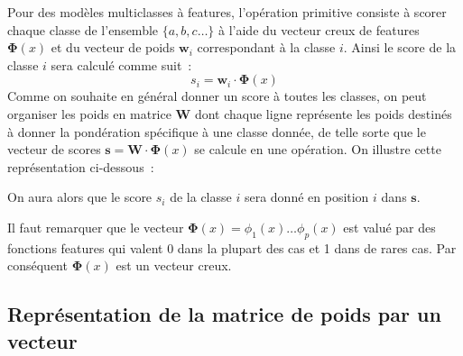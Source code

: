 \documentclass[11pt,openany]{book}
\begin{document}
Pour des modèles multiclasses à features,
l'opération primitive consiste à scorer chaque classe de l'ensemble $\{a,b,c\ldots\}$ à l'aide du vecteur creux de features $\boldsymbol\Phi(x)$ et du vecteur de poids $\mathbf{w}_i$ correspondant à la classe $i$. Ainsi le score de la classe $i$ sera calculé comme suit~:
\begin{displaymath}
s_i =  \mathbf{w}_i \cdot \boldsymbol\Phi(x)
\end{displaymath}
Comme on souhaite en général donner un score à toutes les classes, on peut organiser les poids en matrice $\mathbf{W}$ dont chaque ligne représente les poids destinés à donner la pondération spécifique à une classe donnée, de telle sorte que le vecteur de scores $\mathbf{s} = \mathbf{W}\cdot \boldsymbol\Phi(x)$ se calcule en une opération.
On illustre cette représentation ci-dessous~:
\begin{center}
\end{center}
On aura alors que le score $s_i$ de la classe $i$ sera donné en position $i$ dans $\mathbf{s}$.

Il faut remarquer que le vecteur $\boldsymbol\Phi(x) = \phi_1(x) \ldots \phi_p(x)$ est valué par des fonctions features qui valent 0 dans la plupart des cas et 1 dans de rares cas. 
Par  conséquent $\boldsymbol\Phi(x)$ est un vecteur creux.



\subsection{Représentation de la matrice de poids par un vecteur}
\end{document}
